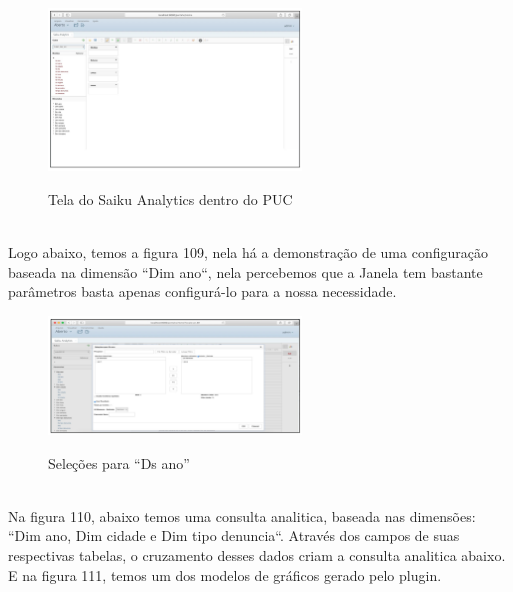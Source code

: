 \begin{figure}[H]
	\vspace*{0,2cm}
    \centering
    \caption{Tela do Saiku Analytics dentro do PUC}
    \includegraphics[width=0.6\textwidth]{./04-figuras/figura-puc-saiku-tela}
    \label{fig:ilustfigpucsaiktela}
\end{figure}
\vspace*{-0,9cm}
{\raggedright {}} \\

Logo abaixo, temos a figura 109, nela h\'{a} a demonstra\c{c}\~{a}o de uma configura\c{c}\~{a}o baseada na dimens\~{a}o ``Dim ano``, nela percebemos que a Janela
tem bastante parâmetros basta apenas configur\'{a}-lo para a nossa necessidade.

\begin{figure}[H]
	\vspace*{0,2cm}
    \centering
    \caption{Sele\c{c}\~{o}es para ``Ds ano''}
    \includegraphics[width=0.6\textwidth]{./04-figuras/figura-puc-saiku-selecao-ds-ano}
    \label{fig:ilustfigpucsaikuselecaodsano}
\end{figure}
\vspace*{-0,9cm}
{\raggedright {}} \\

Na figura 110, abaixo temos uma consulta analitica, baseada nas dimens\~{o}es: ``Dim ano, Dim cidade e Dim tipo denuncia``. Atrav\'{e}s dos campos de suas respectivas 
tabelas, o cruzamento desses dados criam a consulta analitica abaixo. E na figura 111, temos um dos modelos de gr\'{a}ficos gerado pelo plugin.

